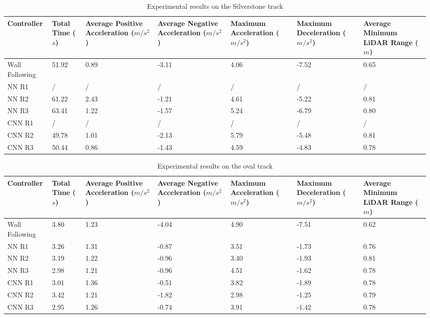\begin{table}
\centering
\begin{tabularx}{\textwidth}{||X|X|X|X|X|X|X||} 
\hline
 Controller & Total Time ($s$) & Average Positive Acceleration ($m/s^2$)& Average Negative Acceleration ($m/s^2$) & Maximum Acceleration ($m/s^2$) & Maximum Deceleration ($m/s^2$) & Average Minimum LiDAR Range ($m$)\\ [0.5ex] 
 \hline\hline
Wall Following & 51.92 & 0.89 & -3.11 & 4.06 & -7.52 & 0.65\\[0.5ex] 
 \hline
 NN R1 & / & / & / & / & / & /\\[0.5ex] 
 \hline
 NN R2 & 61.22 & 2.43 & -1.21 & 4.61 & -5.22 & 0.81\\[0.5ex] 
 \hline
NN R3 & 63.41 & 1.22 & -1.57 & 5.24 & -6.79 & 0.80\\[0.5ex] 
 \hline
 CNN R1 & / & / & / & / & / & /\\[0.5ex] 
 \hline
 CNN R2 & 49.78 & 1.01 & -2.13 & 5.79 & -5.48 & 0.81\\[0.5ex] 
 \hline
 CNN R3 & 50.44 & 0.86 & -1.43 & 4.59 & -4.83 & 0.78\\[0.5ex] 
 \hline
\end{tabularx}
\caption{Experimental results on the Silverstone track}
\label{silverstone_results}
\end{table}


\begin{table}
\centering
\begin{tabularx}{\textwidth}{||X|X|X|X|X|X|X||} 
\hline
 Controller & Total Time ($s$) & Average Positive Acceleration ($m/s^2$)& Average Negative Acceleration ($m/s^2$) & Maximum Acceleration ($m/s^2$) & Maximum Deceleration ($m/s^2$) & Average Minimum LiDAR Range ($m$)\\ [0.5ex] 
 \hline\hline
Wall Following & 3.80 & 1.23 & -4.04 & 4.90 & -7.51 & 0.62\\[0.5ex] 
 \hline
 NN R1 & 3.26 & 1.31 & -0.87 & 3.51 & -1.73 & 0.76\\[0.5ex] 
 \hline
 NN R2 & 3.19 & 1.22 & -0.96 & 3.40 & -1.93 & 0.81\\[0.5ex] 
 \hline
NN R3 & 2.98 & 1.21 & -0.96 & 4.51 & -1.62 & 0.78\\[0.5ex] 
 \hline
 CNN R1 & 3.01 & 1.36 & -0.51 & 3.82 & -1.89 & 0.78\\[0.5ex] 
 \hline
 CNN R2 & 3.42 & 1.21 & -1.82 & 2.98 & -1.25 & 0.79\\[0.5ex] 
 \hline
 CNN R3 & 2.95 & 1.26 & -0.74 & 3.91 & -1.42 & 0.78\\[0.5ex] 
 \hline
\end{tabularx}
\caption{Experimental results on the oval track}
\label{oval_results}
\end{table}

